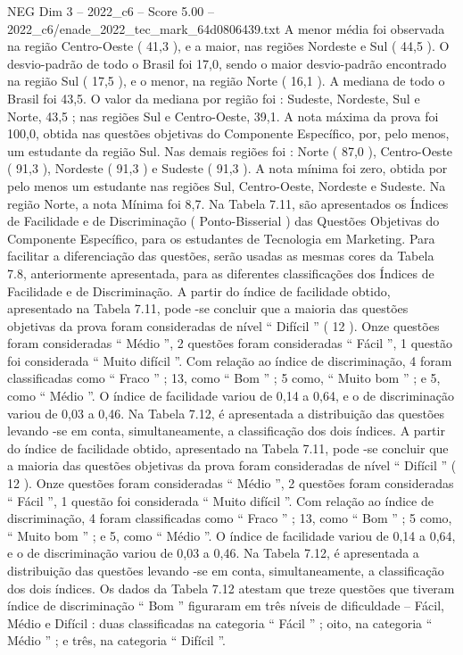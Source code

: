 \begin{textsample}{NEG Dim 3 – 2022\_c6 – Score 5.00 – 2022\_c6/enade\_2022\_tec\_mark\_64d0806439.txt}
A menor média foi observada na região Centro-Oeste ( 41,3 ), e a maior, nas regiões Nordeste e Sul ( 44,5 ).
O desvio-padrão de todo o Brasil foi 17,0, sendo o maior desvio-padrão encontrado na região Sul ( 17,5 ), e o menor, na região Norte ( 16,1 ).
A mediana de todo o Brasil foi 43,5.
O valor da mediana por região foi : Sudeste, Nordeste, Sul e Norte, 43,5 ; nas regiões Sul e Centro-Oeste, 39,1.
A nota máxima da prova foi 100,0, obtida nas questões objetivas do Componente Específico, por, pelo menos, um estudante da região Sul.
Nas demais regiões foi : Norte ( 87,0 ), Centro-Oeste ( 91,3 ), Nordeste ( 91,3 ) e Sudeste ( 91,3 ).
A nota mínima foi zero, obtida por pelo menos um estudante nas regiões Sul, Centro-Oeste, Nordeste e Sudeste.
Na região Norte, a nota Mínima foi 8,7.
Na Tabela 7.11, são apresentados os Índices de Facilidade e de Discriminação ( Ponto-Bisserial ) das Questões Objetivas do Componente Específico, para os estudantes de Tecnologia em Marketing.
Para facilitar a diferenciação das questões, serão usadas as mesmas cores da Tabela 7.8, anteriormente apresentada, para as diferentes classificações dos Índices de Facilidade e de Discriminação.
A partir do índice de facilidade obtido, apresentado na Tabela 7.11, pode -se concluir que a maioria das questões objetivas da prova foram consideradas de nível “ Difícil ” ( 12 ).
Onze questões foram consideradas “ Médio ”, 2 questões foram consideradas “ Fácil ”, 1 questão foi considerada “ Muito difícil ”.
Com relação ao índice de discriminação, 4 foram classificadas como “ Fraco ” ; 13, como “ Bom ” ; 5 como, “ Muito bom ” ; e 5, como “ Médio ”.
O índice de facilidade variou de 0,14 a 0,64, e o de discriminação variou de 0,03 a 0,46.
Na Tabela 7.12, é apresentada a distribuição das questões levando -se em conta, simultaneamente, a classificação dos dois índices.
A partir do índice de facilidade obtido, apresentado na Tabela 7.11, pode -se concluir que a maioria das questões objetivas da prova foram consideradas de nível “ Difícil ” ( 12 ).
Onze questões foram consideradas “ Médio ”, 2 questões foram consideradas “ Fácil ”, 1 questão foi considerada “ Muito difícil ”.
Com relação ao índice de discriminação, 4 foram classificadas como “ Fraco ” ; 13, como “ Bom ” ; 5 como, “ Muito bom ” ; e 5, como “ Médio ”.
O índice de facilidade variou de 0,14 a 0,64, e o de discriminação variou de 0,03 a 0,46.
Na Tabela 7.12, é apresentada a distribuição das questões levando -se em conta, simultaneamente, a classificação dos dois índices.
Os dados da Tabela 7.12 atestam que treze questões que tiveram índice de discriminação “ Bom ” figuraram em três níveis de dificuldade – Fácil, Médio e Difícil : duas classificadas na categoria “ Fácil ” ; oito, na categoria “ Médio ” ; e três, na categoria “ Difícil ”.

\end{textsample}
